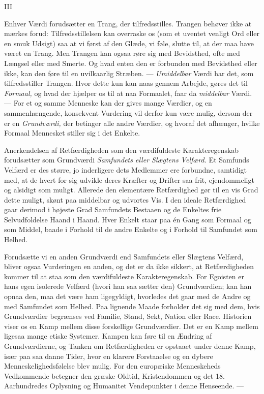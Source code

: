 \documentclass[12pt,a4paper,openany]{book}
\newcommand{\opage}[1]{\marginnote{\footnotesize\textit{[#1]}}}
\begin{document}
\begin{center}III\end{center}


Enhver Værdi forudsætter en Trang, der tilfredsstilles. Trangen
behøver ikke at mærkes forud: Tilfredsstillelsen kan overraske
os (som et uventet venligt Ord eller en smuk Udsigt)
\setcounter{footnote}{0}%
\opage{60}saa at vi først af den Glæde, vi føle, slutte til, at der maa have
været en Trang. Men Trangen kan ogsaa røre sig med Bevidsthed,
ofte med Længsel eller med Smerte. Og hvad enten den er
forbunden med Bevidsthed eller ikke, kan den føre til en uvilkaarlig
Stræben. --- \textit{Umiddelbar} Værdi har det, som tilfredsstiller
Trangen. Hvor dette kun kan naas gennem Arbejde, gøres det
til \textit{Formaal,} og hvad der hjælper os til at naa Formaalet, faar
da \textit{middelbar} Værdi. --- For et og samme Menneske kan der
gives mange Værdier, og en sammenhængende, konsekvent Vurdering
vil derfor kun være mulig, dersom der er en \textit{Grundværdi,}
der betinger alle andre Værdier, og hvoraf det afhænger, hvilke
Formaal Mennesket stiller sig i det Enkelte.

Anerkendelsen af Retfærdigheden som den værdifuldeste
Karakteregenskab forudsætter som Grundværdi \textit{Samfundets eller
Slægtens Velfærd.} Et Samfunds Velfærd er des større, jo inderligere
dets Medlemmer ere forbundne, samtidigt med, at de hvert
for sig udvikle deres Kræfter og Drifter saa frit, ejendommeligt
og alsidigt som muligt. Allerede den elementære Retfærdighed
gør til en vis Grad dette muligt, skønt paa middelbar og udvortes
Vis. I den ideale Retfærdighed gaar derimod i højeste
Grad Samfundets Bestaaen og de Enkeltes frie Selvudfoldelse
Haand i Haand. Hver Enkelt staar paa én Gang som Formaal
og som Middel, baade i Forhold til de andre Enkelte og i Forhold
til Samfundet som Helhed.

Forudsætte vi en anden Grundværdi end Samfundets eller
Slægtens Velfærd, bliver ogsaa Vurderingen en anden, og det
er da ikke sikkert, at Retfærdigheden kommer til at staa som
den værdifuldeste Karakteregenskab. For Egoisten er hans egen
isolerede Velfærd (hvori han saa sætter den) Grundværdien;
kan han opnaa den, maa det være ham ligegyldigt, hvorledes
det gaar med de Andre og med Samfundet som Helhed. Paa
lignende Maade forholder det sig med dem, hvis Grundværdier
begrænses ved Familie, Stand, Sekt, Nation eller Race. Historien
viser os en Kamp mellem disse forskellige Grundværdier.
Det er en Kamp mellem ligesaa mange etiske Systemer. Kampen
kan føre til en Ændring af Grundværdierne, og Tanken om
Retfærdigheden er opstaaet under denne Kamp, især paa saa%
\setcounter{footnote}{0}%
\opage{61}danne Tider, hvor en klarere Forstaaelse og en dybere Menneskelighedsfølelse
blev mulig. For den europæiske Menneskeheds
Vedkommende betegner den græske Oldtid, Kristendommen
og det 18. Aarhundredes Oplysning og Humanitet Vendepunkter
i denne Henseende. ---
\end{document}
